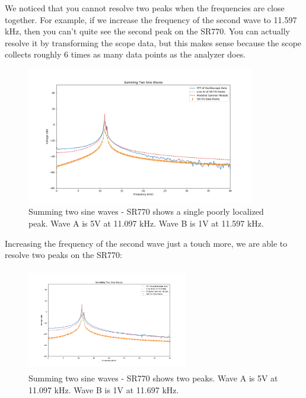 \documentclass{article}
\begin{document}
We noticed that you cannot resolve two peaks when the frequencies are close
together. For example, if we increase the frequency of the second wave to
11.597 kHz, then you can't quite see the second peak on the SR770. You can
actually resolve it by transforming the scope data, but this makes sense
because the scope collects roughly 6 times as many data points as the analyzer
does.

\begin{figure}[H]
    \centering
\begin{minipage}{11cm}
\begin{tcolorbox}
    \centering
        \includegraphics[width=10cm, height=6cm]{figures/figure11.png}
        \caption{Summing two sine waves - SR770 shows a single poorly
        localized peak. Wave A is 5V at 11.097 kHz. Wave B is 1V at 11.597 kHz.}
        \label{fig:fig11}
\end{tcolorbox}
\end{minipage}
\end{figure}

Increasing the frequency of the second wave just a touch more, we are able to
resolve two peaks on the SR770:

\begin{figure}[H]
    \centering
\begin{minipage}{11cm}
\begin{tcolorbox}
    \centering
        \includegraphics[width=7cm, height=4.5cm]{figures/figure12.png}
        \caption{Summing two sine waves - SR770 shows two peaks.
        Wave A is 5V at 11.097 kHz. Wave B is 1V at 11.697 kHz.}
        \label{fig:fig12}
\end{tcolorbox}
\end{minipage}
\end{figure}
\end{document}
